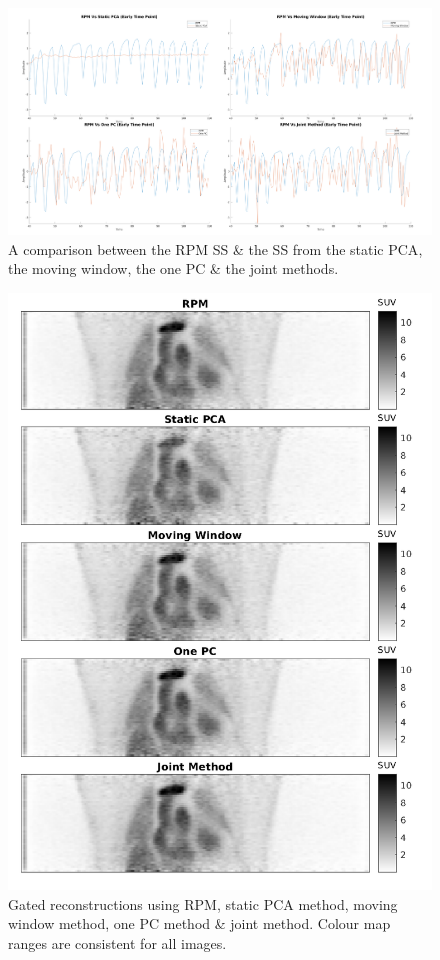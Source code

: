     \begin{figure}
        \centering
        \includegraphics[width=1.0\linewidth]{figures/surrogate_signal.png}
        \captionsetup{singlelinecheck=false, justification=centering}
        \caption{A comparison between the \gls{RPM} \gls{SS} \& the \gls{SS} from the static \gls{PCA}, the moving window, the one \gls{PC} \& the joint methods.}
        \label{fig:surrogate_signal}
    \end{figure}
    
    \begin{figure}
        \centering
        \includegraphics[width=0.75\linewidth]{figures/visual_analysis_pca.png}
        \captionsetup{singlelinecheck=false, justification=centering}
        \caption{Gated reconstructions using \gls{RPM}, static \gls{PCA} method, moving window method, one \gls{PC} method \& joint method. Colour map ranges are consistent for all images.}
        \label{fig:visual_analysis}
    \end{figure}
    
